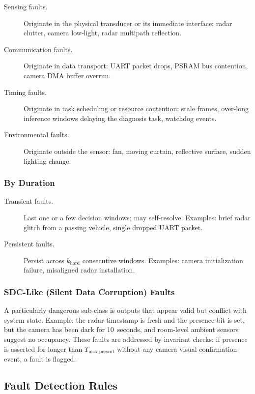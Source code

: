 \documentclass[12pt]{extarticle}
\begin{document}
\begin{description}
  \item[Sensing faults.] Originate in the physical transducer or its immediate
    interface: radar clutter, camera low-light, radar multipath reflection.
  \item[Communication faults.] Originate in data transport: UART packet drops,
    PSRAM bus contention, camera DMA buffer overrun.
  \item[Timing faults.] Originate in task scheduling or resource contention: stale
    frames, over-long inference windows delaying the diagnosis task, watchdog events.
  \item[Environmental faults.] Originate outside the sensor: fan, moving curtain,
    reflective surface, sudden lighting change.
\end{description}

\subsubsection{By Duration}

\begin{description}
  \item[Transient faults.] Last one or a few decision windows; may self-resolve.
    Examples: brief radar glitch from a passing vehicle, single dropped UART packet.
  \item[Persistent faults.] Persist across $k_{\text{hard}}$ consecutive windows.
    Examples: camera initialization failure, misaligned radar installation.
\end{description}

\subsubsection{SDC-Like (Silent Data Corruption) Faults}

A particularly dangerous sub-class is outputs that appear valid but conflict with
system state.
Example: the radar timestamp is fresh and the presence bit is set, but the camera has
been dark for 10~seconds, and room-level ambient sensors suggest no occupancy.
These faults are addressed by invariant checks: if presence is asserted for longer
than $T_{\text{max\_present}}$ without any camera visual confirmation event, a
fault is flagged.

\subsection{Fault Detection Rules}
\end{document}
